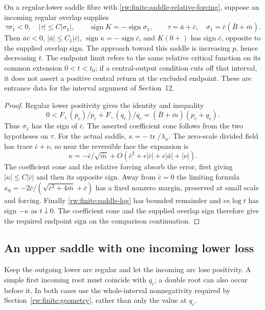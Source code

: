 \begin{lemma}
\label{rw:finite:saddle-entry-signs}
On a regular-lower saddle fibre with
\eqref{rw:finite:saddle-relative-forcing}, suppose an incoming regular
overlap supplies
\[
 \tau\sigma_1<0,\quad |\tau|\le C|\sigma_1|,
 \qquad\operatorname{sign}K=-\operatorname{sign}\sigma_1,
 \qquad \tau=\bar a+\bar c,\quad
 \sigma_1=\bar c(\bar B+\bar m).
\]
Then $\bar a\bar c<0$, $|\bar a|\le C_1|\bar c|$,
$\operatorname{sign}\kappa=-\operatorname{sign}\bar c$, and
$K(0+)$ has sign $\bar c$, opposite to the supplied overlap sign.
The approach toward this saddle is increasing $p$, hence decreasing
$t$. The endpoint limit refers to the same relative critical function
on its common extension $0<t<t_0$; if a central-output condition cuts
off that interval, it does not assert a positive central return at
the excluded endpoint. These are entrance data for the interval
argument of Section~12.
\end{lemma}
\begin{proof}
Regular lower positivity gives the identity and inequality
\[
 0< F_+(p_c)/p_c+F_-(q_c)/q_c
                  =(\bar B+\bar m)(p_c+q_c).
\]
Thus $\sigma_1$ has the sign of $\bar c$. The asserted coefficient
cone follows from the two hypotheses on $\tau$.
For the actual saddle, $\kappa=-\operatorname{tr}/\lambda_u$.
The zero-scale divided field has trace $\bar c+\nu$, so near the
reversible face the expansion is
\[
 \kappa=-\bar c/\sqrt{\bar m}
 +O(\bar c^2+\epsilon|\bar c|+\epsilon|\bar a|+|\nu|).
\]
The coefficient cone and the relative forcing absorb the error,
first giving $|\kappa|\le C|\bar c|$ and then its opposite sign.
Away from $\bar c=0$ the limiting formula
$\kappa_0=-2\bar c/(\sqrt{\bar c^2+4\bar m}+\bar c)$
has a fixed nonzero margin, preserved at small scale and forcing.
Finally \eqref{rw:finite:saddle-log} has bounded remainder and
$\epsilon\kappa\log t$ has sign $-\kappa$ as $t\downarrow0$.
The coefficient cone and the supplied overlap sign therefore give
the required endpoint sign on the comparison continuation.
\end{proof}

\subsection{An upper saddle with one incoming lower loss}
\label{rw:finite:upper-loss-section}

Keep the outgoing lower arc regular and let the incoming arc lose
positivity. A simple first incoming root must coincide with $q_c$;
a double root can also occur before it. In both cases use the
whole-interval nonnegativity required by
Section~\ref{rw:finite:geometry}, rather than only the value at $q_c$.

